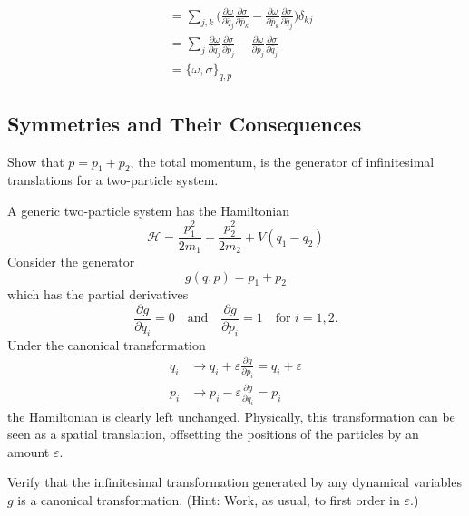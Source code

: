 \documentclass[../principles-of-quantum-mechanics.tex]{subfiles}
\begin{document}
\begin{questions}
\begin{solution}
\begin{align*}
				&= \sum_{j, k}\Big(\frac{\partial\omega}{\partial \bar{q}_j}\frac{\partial\sigma}{\partial \bar{p}_k} - \frac{\partial\omega}{\partial \bar{p}_k}\frac{\partial\sigma}{\partial \bar{q}_j}\Big)\delta_{kj} \\
				&= \sum_{j}\frac{\partial\omega}{\partial \bar{q}_j}\frac{\partial\sigma}{\partial \bar{p}_j} - \frac{\partial\omega}{\partial \bar{p}_j}\frac{\partial\sigma}{\partial \bar{q}_j} \\
				&= \{\omega, \sigma\}_{\bar{q}, \bar{p}}
			\end{align*}
		\end{solution}
		
		\setcounter{subsection}{7}
		\setcounter{question}{0}
		\subsection{Symmetries and Their Consequences}
		\question Show that $p = p_1 + p_2$, the total momentum, is the generator of infinitesimal translations for a two-particle system.
		
		\begin{solution}
			A generic two-particle system has the Hamiltonian
			\[
				\mathcal{H} = \frac{p_1^2}{2m_1} + \frac{p_2^2}{2m_2} + V(q_1 - q_2)
			\]
			Consider the generator
			\[
				g(q, p) = p_1 + p_2
			\]
			which has the partial derivatives
			\[
				\frac{\partial g}{\partial q_i} = 0 \quad\text{and}\quad \frac{\partial g}{\partial p_i} = 1 \quad\text{for }i=1,2.
			\]
			Under the canonical transformation
			\begin{align*}
				q_i &\to q_i + \varepsilon\frac{\partial g}{\partial p_i} = q_i + \varepsilon \\
				p_i &\to p_i - \varepsilon\frac{\partial g}{\partial q_i} = p_i
			\end{align*}
			the Hamiltonian is clearly left unchanged. Physically, this transformation can be seen as a spatial translation, offsetting the positions of the particles by an amount $\varepsilon$.
		\end{solution}
		
		\question Verify that the infinitesimal transformation generated by any dynamical variables $g$ is a canonical transformation. (Hint: Work, as usual, to first order in $\varepsilon$.)
		

\end{questions}
\end{document}
